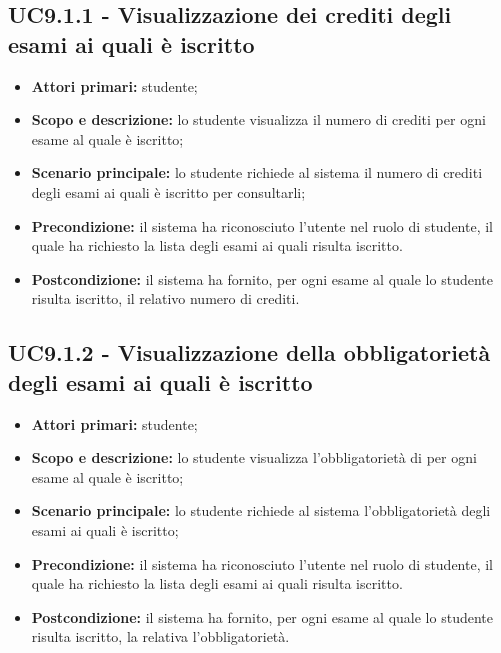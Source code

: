 \documentclass[AnalisiDeiRequisiti.tex]{subfiles}
\begin{document}
\subsection{UC9.1.1 - Visualizzazione dei crediti degli esami ai quali è iscritto}
\begin{itemize}
	\item \textbf{Attori primari:} studente;
	\item \textbf{Scopo e descrizione:} lo studente visualizza il numero di crediti per ogni esame al quale è iscritto;
	\item \textbf{Scenario principale:} lo studente richiede al sistema il numero di crediti degli esami ai quali è iscritto per consultarli;
	\item \textbf{Precondizione:} il sistema ha riconosciuto l'utente nel ruolo di studente, il quale ha richiesto la lista degli esami ai quali risulta iscritto. 
	\item \textbf{Postcondizione:} il sistema ha fornito, per ogni esame al quale lo studente risulta iscritto, il relativo numero di crediti.
\end{itemize}

\subsection{UC9.1.2 - Visualizzazione della obbligatorietà degli esami ai quali è iscritto}
\begin{itemize}
	\item \textbf{Attori primari:} studente;
	\item \textbf{Scopo e descrizione:} lo studente visualizza l'obbligatorietà di per ogni esame al quale è iscritto;
	\item \textbf{Scenario principale:} lo studente richiede al sistema l'obbligatorietà degli esami ai quali è iscritto;
	\item \textbf{Precondizione:} il sistema ha riconosciuto l'utente nel ruolo di studente, il quale ha richiesto la lista degli esami ai quali risulta iscritto. 
	\item \textbf{Postcondizione:} il sistema ha fornito, per ogni esame al quale lo studente risulta iscritto, la relativa l'obbligatorietà.
\end{itemize}
\end{document}

